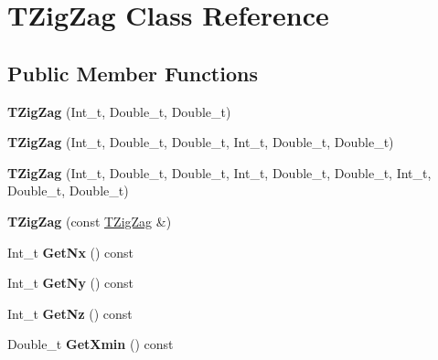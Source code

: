 \hypertarget{classTZigZag}{\section{T\-Zig\-Zag Class Reference}
\label{classTZigZag}
}
\subsection*{Public Member Functions}
\begin{DoxyCompactItemize}
\item 
\hypertarget{classTZigZag_a87b35c0bfb83a92ceab80a3079fe02e1}{{\bfseries T\-Zig\-Zag} (Int\-\_\-t, Double\-\_\-t, Double\-\_\-t)}\label{classTZigZag_a87b35c0bfb83a92ceab80a3079fe02e1}

\item 
\hypertarget{classTZigZag_a0d136eb3964914e71acd72f36de150fb}{{\bfseries T\-Zig\-Zag} (Int\-\_\-t, Double\-\_\-t, Double\-\_\-t, Int\-\_\-t, Double\-\_\-t, Double\-\_\-t)}\label{classTZigZag_a0d136eb3964914e71acd72f36de150fb}

\item 
\hypertarget{classTZigZag_a08f3c9bea5de91756c37c4b94baf0266}{{\bfseries T\-Zig\-Zag} (Int\-\_\-t, Double\-\_\-t, Double\-\_\-t, Int\-\_\-t, Double\-\_\-t, Double\-\_\-t, Int\-\_\-t, Double\-\_\-t, Double\-\_\-t)}\label{classTZigZag_a08f3c9bea5de91756c37c4b94baf0266}

\item 
\hypertarget{classTZigZag_a462dfa55ecd89ad2bc8360b05df958e6}{{\bfseries T\-Zig\-Zag} (const \hyperlink{classTZigZag}{T\-Zig\-Zag} \&)}\label{classTZigZag_a462dfa55ecd89ad2bc8360b05df958e6}

\item 
\hypertarget{classTZigZag_adc1ecdb53be5992c0a11394bbfb6c3fb}{Int\-\_\-t {\bfseries Get\-Nx} () const }\label{classTZigZag_adc1ecdb53be5992c0a11394bbfb6c3fb}

\item 
\hypertarget{classTZigZag_ab2c385ded9f204e378c44b0034eb61fe}{Int\-\_\-t {\bfseries Get\-Ny} () const }\label{classTZigZag_ab2c385ded9f204e378c44b0034eb61fe}

\item 
\hypertarget{classTZigZag_a9e3d1d274aa2e845ad1ee81b8c0c5c32}{Int\-\_\-t {\bfseries Get\-Nz} () const }\label{classTZigZag_a9e3d1d274aa2e845ad1ee81b8c0c5c32}

\item 
\hypertarget{classTZigZag_a82ae6cbfcbd5db43ab535b1abf5a85dc}{Double\-\_\-t {\bfseries Get\-Xmin} () const }\label{classTZigZag_a82ae6cbfcbd5db43ab535b1abf5a85dc}


\end{DoxyCompactItemize}
